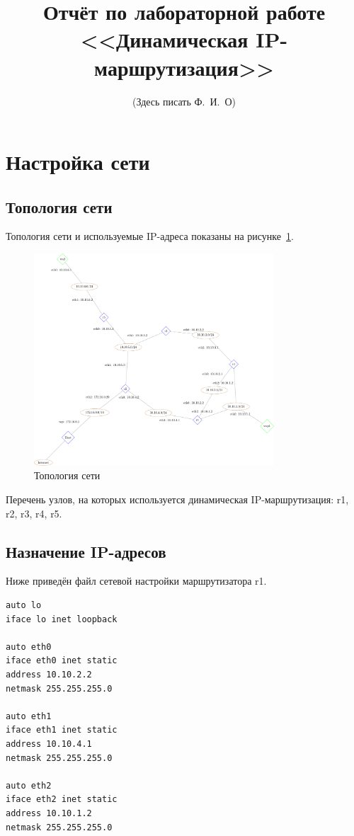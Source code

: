 \documentclass[a4paper,12pt]{article}
\title{Отчёт по лабораторной работе \\ <<Динамическая IP-маршрутизация>>}
\author{(Здесь писать Ф.~И.~О)}
\begin{document}
\maketitle

\tableofcontents

\section{Настройка сети}

\subsection{Топология сети}

Топология сети и используемые IP-адреса показаны на рисунке~\ref{fig:network}.

\begin{figure}
\centering
\includegraphics[width=0.8\textwidth]{includes/network_gv.pdf}
\caption{Топология сети}
\label{fig:network}
\end{figure}
\newpage

Перечень узлов, на которых используется динамическая IP-маршрутизация: r1, r2, r3, r4, r5.


\subsection{Назначение IP-адресов}

Ниже приведён файл сетевой настройки  маршрутизатора r1.

\begin{Verbatim}
auto lo
iface lo inet loopback

auto eth0
iface eth0 inet static
address 10.10.2.2
netmask 255.255.255.0

auto eth1
iface eth1 inet static
address 10.10.4.1
netmask 255.255.255.0

auto eth2
iface eth2 inet static
address 10.10.1.2
netmask 255.255.255.0

\end{Verbatim}
\end{document}
